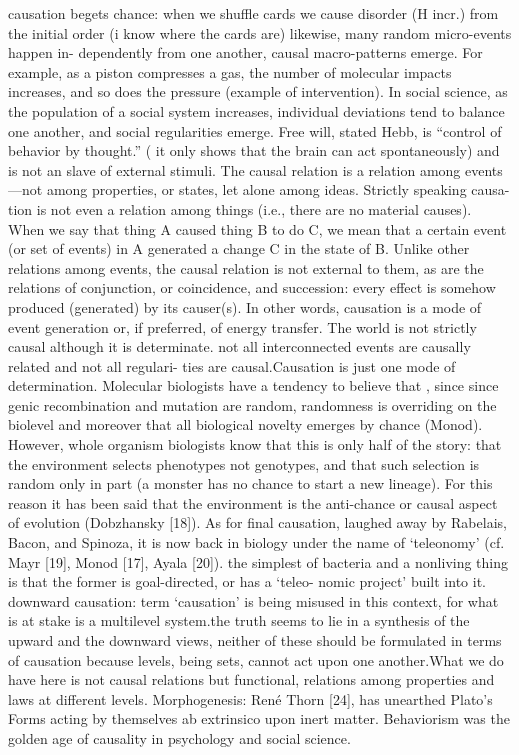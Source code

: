 \documentclass[onecollarge,runningheads]{svjour2}
\begin{document}
causation begets chance: when we shuffle cards we cause disorder (H incr.) from the initial order (i know where the cards are) likewise, many random micro-events happen in- dependently from one another, causal macro-patterns emerge. For example, as a piston compresses a gas, the number of molecular impacts increases, and so does the pressure (example of intervention). In social science, as the population of a social system increases, individual deviations tend to balance one another, and social regularities emerge. Free will, stated Hebb, is “control of behavior by thought.” ( it only shows that the brain can act spontaneously) and is not an slave of external stimuli.
The causal relation is a relation among events—not among properties, or states, let alone among ideas. Strictly speaking causa- tion is not even a relation among things (i.e., there are no material causes). When we say that thing A caused thing B to do C, we mean that a certain event (or set of events) in A generated a change C in the state of B.
Unlike other relations among events, the causal relation is not external to them, as are the relations of conjunction, or coincidence, and succession: every effect is somehow produced (generated) by its causer(s). In other words, causation is a mode of event generation or, if preferred, of energy transfer.
The world is not strictly causal although it is determinate. not all interconnected events are causally related and not all regulari- ties are causal.Causation is just one mode of determination.
Molecular biologists have a tendency to believe that , since since genic recombination and mutation are random, randomness is overriding on the biolevel and moreover that all biological novelty emerges by chance (Monod). However, whole organism biologists know that this is only half of the story: that the environment selects phenotypes not genotypes, and that such selection is random only in part (a monster has no chance to start a new lineage). For this reason it has been said that the environment is the anti-chance or causal aspect of evolution (Dobzhansky [18]).
As for final causation, laughed away by Rabelais, Bacon, and Spinoza, it is now back in biology under the name of ‘teleonomy’ (cf. Mayr [19], Monod [17], Ayala [20]). the simplest of bacteria and a nonliving thing is that the former is goal-directed, or has a ‘teleo- nomic project’ built into it. downward causation: term ‘causation’ is being misused in this context, for what is at stake is a multilevel system.the truth seems to lie in a synthesis of the upward and the downward views, neither of these should be formulated in terms of causation because levels, being sets, cannot act upon one another.What we do have here is not causal relations but functional, relations among properties and laws at different levels. Morphogenesis: René Thorn [24], has unearthed Plato’s Forms acting by themselves ab extrinsico upon inert matter. Behaviorism was the golden age of causality in psychology and social science.
\end{document}
